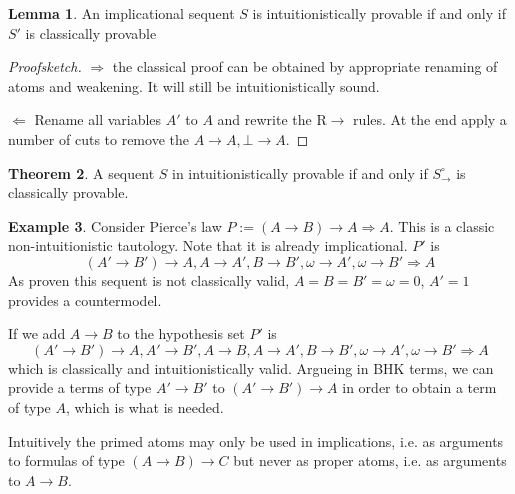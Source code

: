 \documentclass[a4paper,12pt]{article}
\theoremstyle{definition}
\newtheorem{theorem}{Theorem}[section]
\theoremstyle{definition}
\theoremstyle{definition}
\newtheorem{lemma}[theorem]{Lemma}
\theoremstyle{definition}
\theoremstyle{definition}
\theoremstyle{definition}
\newtheorem{example}[theorem]{Example}
\begin{document}
	\begin{lemma}
		An implicational sequent $S$ is intuitionistically provable if and only if $S'$ is classically provable
	\end{lemma}
	
	\begin{proof}[Proofsketch]
		
		$\Rightarrow$ the classical proof can be obtained by appropriate renaming of atoms and weakening. It will still be intuitionistically sound.
		
		$\Leftarrow$ Rename all variables $A'$ to $A$ and rewrite the R$\to$ rules. At the end apply a number of cuts to remove the $A\to A,\bot\to A$.
		
	\end{proof}

	\begin{theorem}
		A sequent $S$ in intuitionistically provable if and only if $S^\circ_\to$ is classically provable.
	\end{theorem}

	\begin{example}
		Consider Pierce's law $P := (A\to B)\to A\Rightarrow A$. This is a classic non-intuitionistic tautology. Note that it is already implicational. $P'$ is $$(A'\to B')\to A, A\to A', B\to B', \omega\to A', \omega\to B'\Rightarrow A$$ As proven this sequent is not classically valid, $A = B = B' = \omega = 0$, $A' = 1$  provides a countermodel.
		
		If we add $A\to B$ to the hypothesis set $P'$ is $$(A'\to B')\to A, A'\to B', A\to B, A\to A', B\to B', \omega\to A', \omega\to B'\Rightarrow A$$ which is classically and intuitionistically valid. Argueing in BHK terms, we can provide a terms of type $A'\to B'$ to $(A'\to B')\to A$ in order to obtain a term of type $A$, which is what is needed.
	\end{example}

	Intuitively the primed atoms may only be used in implications, i.e. as arguments to formulas of type $(A\to B)\to C$ but never as proper atoms, i.e. as arguments to $A\to B$.
	
	
	
	
\end{document}
